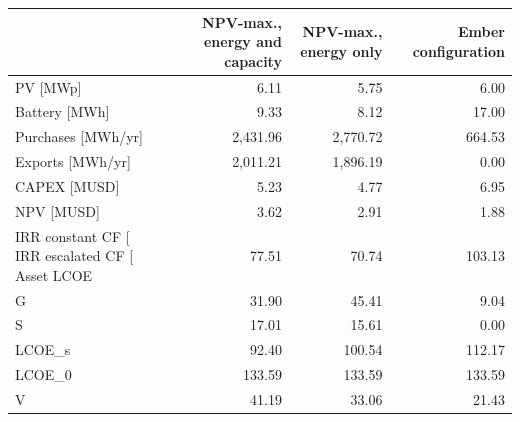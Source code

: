 \begin{tabular}{lrrr}
\toprule
 & NPV-max., energy and capacity & NPV-max., energy only & Ember configuration \\
\midrule
PV [MWp] & 6.11 & 5.75 & 6.00 \\
Battery [MWh] & 9.33 & 8.12 & 17.00 \\
Purchases [MWh/yr] & 2,431.96 & 2,770.72 & 664.53 \\
Exports [MWh/yr] & 2,011.21 & 1,896.19 & 0.00 \\
CAPEX [MUSD] & 5.23 & 4.77 & 6.95 \\
NPV [MUSD] & 3.62 & 2.91 & 1.88 \\
IRR constant CF [%
IRR escalated CF [%
Asset LCOE & 77.51 & 70.74 & 103.13 \\
G & 31.90 & 45.41 & 9.04 \\
S & 17.01 & 15.61 & 0.00 \\
LCOE_s & 92.40 & 100.54 & 112.17 \\
LCOE_0 & 133.59 & 133.59 & 133.59 \\
V & 41.19 & 33.06 & 21.43 \\
\bottomrule
\end{tabular}
